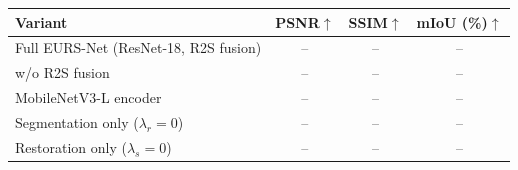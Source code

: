 \begin{tabular}{lccc}
\toprule
Variant & PSNR$\uparrow$ & SSIM$\uparrow$ & mIoU (\%)$\uparrow$ \\
\midrule
Full EURS-Net (ResNet-18, R2S fusion) & -- & -- & -- \\
w/o R2S fusion & -- & -- & -- \\
MobileNetV3-L encoder & -- & -- & -- \\
Segmentation only ($\lambda_r{=}0$) & -- & -- & -- \\
Restoration only ($\lambda_s{=}0$) & -- & -- & -- \\
\bottomrule
\end{tabular}
